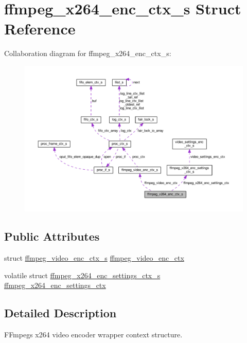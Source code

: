 \hypertarget{structffmpeg__x264__enc__ctx__s}{}\section{ffmpeg\+\_\+x264\+\_\+enc\+\_\+ctx\+\_\+s Struct Reference}
\label{structffmpeg__x264__enc__ctx__s}


Collaboration diagram for ffmpeg\+\_\+x264\+\_\+enc\+\_\+ctx\+\_\+s\+:\nopagebreak
\begin{figure}[H]
\begin{center}
\leavevmode
\includegraphics[width=350pt]{structffmpeg__x264__enc__ctx__s__coll__graph}
\end{center}
\end{figure}
\subsection*{Public Attributes}
\begin{DoxyCompactItemize}
\item 
struct \hyperlink{structffmpeg__video__enc__ctx__s}{ffmpeg\+\_\+video\+\_\+enc\+\_\+ctx\+\_\+s} \hyperlink{structffmpeg__x264__enc__ctx__s_a782710a2e5a3ff63716885b491ba05dd}{ffmpeg\+\_\+video\+\_\+enc\+\_\+ctx}
\item 
volatile struct \hyperlink{structffmpeg__x264__enc__settings__ctx__s}{ffmpeg\+\_\+x264\+\_\+enc\+\_\+settings\+\_\+ctx\+\_\+s} \hyperlink{structffmpeg__x264__enc__ctx__s_a6d22abf4f30d02f8bb4b809579595e83}{ffmpeg\+\_\+x264\+\_\+enc\+\_\+settings\+\_\+ctx}
\end{DoxyCompactItemize}


\subsection{Detailed Description}
F\+Fmpeg\textquotesingle{}s x264 video encoder wrapper context structure. 

